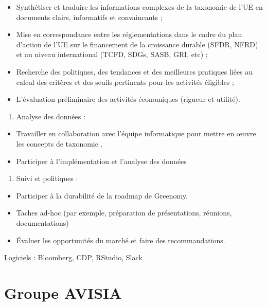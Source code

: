 \documentclass[
  letterpaper,
  DIV=11,
  numbers=noendperiod]{scrreprt}
\providecommand{\tightlist}{%
  \setlength{\itemsep}{0pt}\setlength{\parskip}{0pt}}\usepackage{longtable,booktabs,array}
\begin{document}
\begin{itemize}
\item
  Synthétiser et traduire les informations complexes de la taxonomie de
  l'UE en documents clairs, informatifs et convaincants ;
\item
  Mise en correspondance entre les réglementations dans le cadre du plan
  d'action de l'UE sur le financement de la croissance durable (SFDR,
  NFRD) et au niveau international (TCFD, SDGs, SASB, GRI, etc) ;
\item
  Recherche des politiques, des tendances et des meilleures pratiques
  liées au calcul des critères et des seuils pertinents pour les
  activités éligibles ;
\item
  L'évaluation préliminaire des activités économiques (rigueur et
  utilité).
\end{itemize}

\begin{enumerate}
\def\labelenumi{\arabic{enumi}.}
\setcounter{enumi}{1}
\tightlist
\item
  Analyse des données :
\end{enumerate}

\begin{itemize}
\item
  Travailler en collaboration avec l'équipe informatique pour mettre en
  œuvre les concepts de taxonomie .
\item
  Participer à l'implémentation et l'analyse des données
\end{itemize}

\begin{enumerate}
\def\labelenumi{\arabic{enumi}.}
\setcounter{enumi}{2}
\tightlist
\item
  Suivi et politiques :
\end{enumerate}

\begin{itemize}
\item
  Participer à la durabilité de la roadmap de Greenomy.
\item
  Taches ad-hoc (par exemple, préparation de présentations, réunions,
  documentations)
\item
  Évaluer les opportunités du marché et faire des recommandations.
\end{itemize}

\uline{Logiciels :} Bloomberg, CDP, RStudio, Slack

\hypertarget{groupe-avisia}{%
\section{\texorpdfstring{\textbf{Groupe
AVISIA}}{Groupe AVISIA}}\label{groupe-avisia}}
\end{document}
